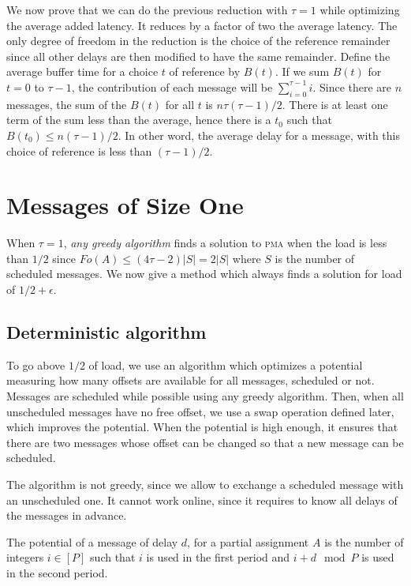 \documentclass[a4paper,UKenglish,cleveref, autoref, thm-restate]{lipics-v2019}
\newcommand\pma{\textsc{pma}\xspace}
\begin{document}
We now prove that we can do the previous reduction with $\tau=1$ while optimizing the average added latency. It reduces by a factor of two the average latency. The only degree of freedom in the reduction is the choice of the reference remainder since all other delays are then modified to have the same remainder.
Define the average buffer time for a choice $t$ of reference by $B(t)$. 
If we sum $B(t)$ for $t=0$ to $\tau-1$, the contribution of each message 
will be $\sum_{i=0}^{\tau-1} i$. Since there are $n$ messages, the sum of the $B(t)$ for all $t$ is $n \tau (\tau-1)/2$. There is at least one term of the sum less than the average,
hence there is a $t_0$ such that $B(t_0) \leq n (\tau-1)/2$. In other word, the average
delay for a message, with this choice of reference is less than $(\tau -1)/2$.


\section{Messages of Size One} \label{sec:small}

When $\tau = 1$, \emph{any greedy algorithm} finds a solution to \pma when the load is less than $1/2$ since $Fo(A) \leq (4\tau -2)|S| = 2|S|$ where $S$ is the number of scheduled messages. We now give a method which always finds a solution for load of $1/2 + \epsilon$.

\subsection{Deterministic algorithm}

To go above $1/2$ of load, we use an algorithm which optimizes a potential measuring how many offsets are available for all messages, scheduled or not. Messages are scheduled while possible using any greedy algorithm.
Then, when all unscheduled messages have no free offset, we use a swap operation defined later, which improves the potential. When the potential is high enough, it ensures that there are two messages whose offset can be changed so that a new message can be scheduled. 

 The algorithm is not greedy, since we allow to exchange a scheduled message with an unscheduled one. It cannot work online, since it requires to know all delays of the messages in advance. 

\begin{definition}
The potential of a message of delay $d$, for a partial assignment $A$
is the number of integers $i \in [P]$ such that $i$ is used in the first period and $i+d \mod P$ is used in the second period.
\end{definition}
\end{document}
